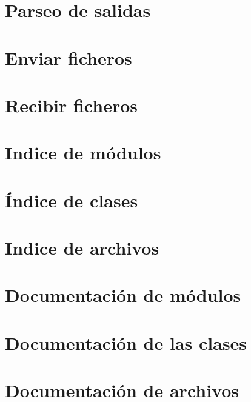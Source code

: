 \documentclass[twoside]{book}
\newcommand{\+}{\discretionary{\mbox{\scriptsize$\hookleftarrow$}}{}{}}
\newcommand{\clearemptydoublepage}{%
  \newpage{\pagestyle{empty}\cleardoublepage}%
}
\begin{document}
\chapter{Parseo de salidas}
\label{client_execute_out_function}
\hypertarget{client_execute_out_function}{}

\chapter{Enviar ficheros}
\label{server_especial_enviar_ficheros}
\hypertarget{server_especial_enviar_ficheros}{}

\chapter{Recibir ficheros}
\label{server_especial_recibir_ficheros}
\hypertarget{server_especial_recibir_ficheros}{}

\chapter{Indice de módulos}

\chapter{Índice de clases}

\chapter{Indice de archivos}

\chapter{Documentación de módulos}


\chapter{Documentación de las clases}

\chapter{Documentación de archivos}













\backmatter
\newpage
{}
\clearemptydoublepage
{}
\printindex
\end{document}
